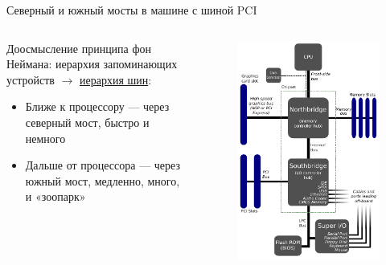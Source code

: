 \documentclass[xetex,aspectratio=43]{beamer}
\begin{document}
\begin{frame}{Северный и южный мосты в машине с шиной PCI}
    \begin{columns}
        \begin{column}{0.5\textwidth}
            Доосмысление принципа фон Неймана: иерархия запоминающих устройств \( \rightarrow \) \href{https://en.wikipedia.org/wiki/Northbridge_(computing)}{иерархия шин}:
            \begin{itemize}
                \item Ближе к процессору --- через северный мост, быстро и немного
                \item Дальше от процессора --- через южный мост, медленно, много, и «зоопарк»
            \end{itemize}
        \end{column}
        \begin{column}{0.5\textwidth}
            \vspace{-5mm}
            \begin{figure}
                \includegraphics[height=0.9\textheight]{img/03.Motherboard_diagram.pdf}
            \end{figure}
        \end{column}
    \end{columns}
\end{frame}
\end{document}
